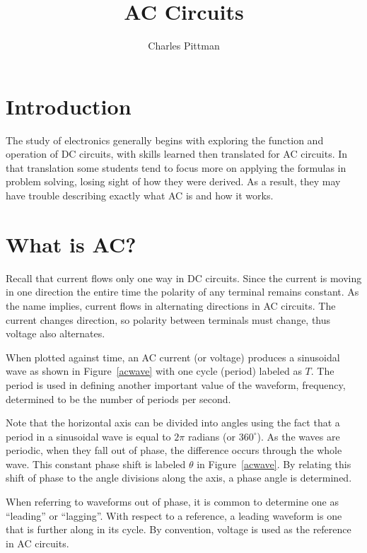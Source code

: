 \documentclass[12pt]{article}
\author{Charles Pittman}
\title{AC Circuits}
\begin{document}
\maketitle

\section*{Introduction}

The study of electronics generally begins with exploring the function and
operation of \ac{DC} circuits, with skills learned then translated for \ac{AC}
circuits.  In that translation some students tend to focus more on applying the
formulas in problem solving, losing sight of how they were derived.  As a
result, they may have trouble describing exactly what \ac{AC} is and how it
works.

\section*{What is \ac{AC}?}

Recall that current flows only one way in \ac{DC} circuits.  Since the current
is moving in one direction the entire time the polarity of any terminal remains
constant.  As the name implies, current flows in alternating directions in
\ac{AC} circuits.  The current changes direction, so polarity between terminals
must change, thus voltage also alternates.

When plotted against time, an \ac{AC} current (or voltage) produces a
sinusoidal wave as shown in Figure~\ref{acwave} with one cycle (period) labeled
as $T$.  The period is used in defining another important value of the
waveform, frequency, determined to be the number of periods per second.

Note that the horizontal axis can be divided into angles using the fact that a
period in a sinusoidal wave is equal to $2\pi$ radians (or $360^\circ$).  As
the waves are periodic, when they fall out of phase, the difference occurs
through the whole wave.  This constant phase shift is labeled $\theta$ in
Figure~\ref{acwave}.  By relating this shift of phase to the angle divisions
along the axis, a phase angle is determined.

When referring to waveforms out of phase, it is common to determine one as
``leading'' or ``lagging''.  With respect to a reference, a leading waveform is
one that is further along in its cycle.  By convention, voltage is used as the
reference in \ac{AC} circuits.
\end{document}
